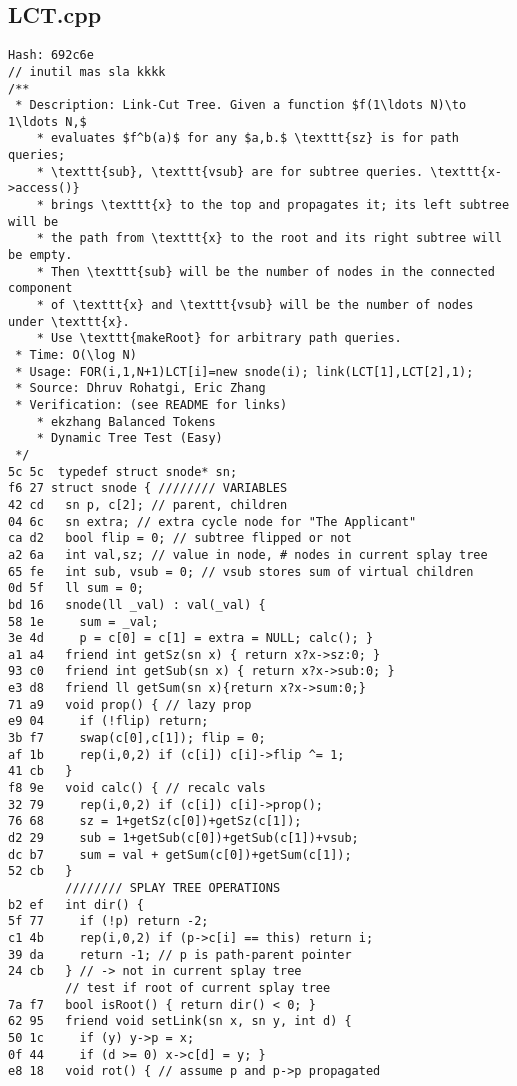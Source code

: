\documentclass[11pt, a4paper, twoside]{article}
\begin{document}
\subsection{LCT.cpp}
\begin{lstlisting}
Hash: 692c6e
// inutil mas sla kkkk
/**
 * Description: Link-Cut Tree. Given a function $f(1\ldots N)\to 1\ldots N,$ 
 	* evaluates $f^b(a)$ for any $a,b.$ \texttt{sz} is for path queries; 
 	* \texttt{sub}, \texttt{vsub} are for subtree queries. \texttt{x->access()} 
 	* brings \texttt{x} to the top and propagates it; its left subtree will be 
 	* the path from \texttt{x} to the root and its right subtree will be empty. 
 	* Then \texttt{sub} will be the number of nodes in the connected component
 	* of \texttt{x} and \texttt{vsub} will be the number of nodes under \texttt{x}.
 	* Use \texttt{makeRoot} for arbitrary path queries.
 * Time: O(\log N)
 * Usage: FOR(i,1,N+1)LCT[i]=new snode(i); link(LCT[1],LCT[2],1);
 * Source: Dhruv Rohatgi, Eric Zhang
 * Verification: (see README for links)
	* ekzhang Balanced Tokens
	* Dynamic Tree Test (Easy)
 */
5c 5c  typedef struct snode* sn;
f6 27 struct snode { //////// VARIABLES
42 cd   sn p, c[2]; // parent, children
04 6c   sn extra; // extra cycle node for "The Applicant"
ca d2   bool flip = 0; // subtree flipped or not
a2 6a   int val,sz; // value in node, # nodes in current splay tree
65 fe   int sub, vsub = 0; // vsub stores sum of virtual children
0d 5f   ll sum = 0;
bd 16   snode(ll _val) : val(_val) {
58 1e     sum = _val;
3e 4d     p = c[0] = c[1] = extra = NULL; calc(); }
a1 a4   friend int getSz(sn x) { return x?x->sz:0; }
93 c0   friend int getSub(sn x) { return x?x->sub:0; }
e3 d8   friend ll getSum(sn x){return x?x->sum:0;}
71 a9   void prop() { // lazy prop
e9 04     if (!flip) return;
3b f7     swap(c[0],c[1]); flip = 0;
af 1b     rep(i,0,2) if (c[i]) c[i]->flip ^= 1;
41 cb   }
f8 9e   void calc() { // recalc vals
32 79     rep(i,0,2) if (c[i]) c[i]->prop();
76 68     sz = 1+getSz(c[0])+getSz(c[1]);
d2 29     sub = 1+getSub(c[0])+getSub(c[1])+vsub;
dc b7     sum = val + getSum(c[0])+getSum(c[1]);
52 cb   }
        //////// SPLAY TREE OPERATIONS
b2 ef   int dir() {
5f 77     if (!p) return -2;
c1 4b     rep(i,0,2) if (p->c[i] == this) return i;
39 da     return -1; // p is path-parent pointer
24 cb   } // -> not in current splay tree
        // test if root of current splay tree
7a f7   bool isRoot() { return dir() < 0; } 
62 95   friend void setLink(sn x, sn y, int d) {
50 1c     if (y) y->p = x;
0f 44     if (d >= 0) x->c[d] = y; }
e8 18   void rot() { // assume p and p->p propagated

\end{lstlisting}
\end{document}
